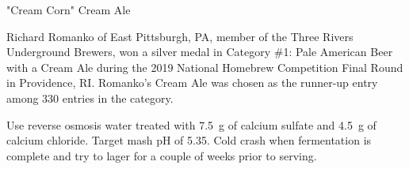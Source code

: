 \begin{recipie}{"Cream Corn" Cream Ale}

\begin{aboutblock}
Richard Romanko of East Pittsburgh, PA, member of the Three Rivers Underground Brewers,
won a silver medal in Category \#1: Pale American Beer with a Cream Ale during the 2019
National Homebrew Competition Final Round in Providence, RI. Romanko's Cream Ale was
chosen as the runner-up entry among 330 entries in the category. \sourceaha
\end{aboutblock}
 

\begin{methodandtiming}
 
\begin{mashsteps}
\end{mashsteps}

\begin{directions}
Use reverse osmosis water treated with 7.5~g of calcium sulfate and 4.5~g of calcium
chloride. Target mash pH of 5.35. Cold crash when fermentation is complete and
try to lager for a couple of weeks prior to serving.
\end{directions}

\end{methodandtiming}

\pagebreak

\begin{ingredientsblock}

\begin{malts}
\end{malts}

\begin{hops}
\end{hops}


\end{ingredientsblock}

\end{recipie}
